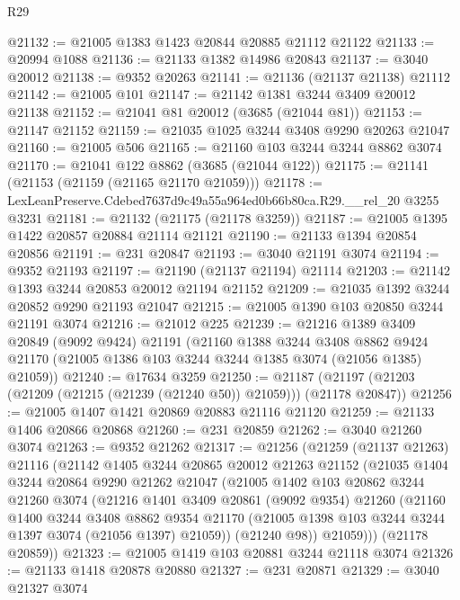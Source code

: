 \begin{lexlean}{R29}
\begin{coremodule}
@21132 := @21005 @1383 @1423 @20844 @20885 @21112 @21122
@21133 := @20994 @1088
@21136 := @21133 @1382 @14986 @20843
@21137 := @3040 @20012
@21138 := @9352 @20263
@21141 := @21136 (@21137 @21138) @21112
@21142 := @21005 @101
@21147 := @21142 @1381 @3244 @3409 @20012 @21138
@21152 := @21041 @81 @20012 (@3685 (@21044 @81))
@21153 := @21147 @21152
@21159 := @21035 @1025 @3244 @3408 @9290 @20263 @21047
@21160 := @21005 @506
@21165 := @21160 @103 @3244 @3244 @8862 @3074
@21170 := @21041 @122 @8862 (@3685 (@21044 @122))
@21175 := @21141 (@21153 (@21159 (@21165 @21170 @21059)))
@21178 := LexLeanPreserve.Cdebed7637d9c49a55a964ed0b66b80ca.R29.__rel_20 @3255 @3231
@21181 := @21132 (@21175 (@21178 @3259))
@21187 := @21005 @1395 @1422 @20857 @20884 @21114 @21121
@21190 := @21133 @1394 @20854 @20856
@21191 := @231 @20847
@21193 := @3040 @21191 @3074
@21194 := @9352 @21193
@21197 := @21190 (@21137 @21194) @21114
@21203 := @21142 @1393 @3244 @20853 @20012 @21194 @21152
@21209 := @21035 @1392 @3244 @20852 @9290 @21193 @21047
@21215 := @21005 @1390 @103 @20850 @3244 @21191 @3074
@21216 := @21012 @225
@21239 := @21216
    @1389
    @3409
    @20849
    (@9092 @9424)
    @21191
    (@21160
      @1388
      @3244
      @3408
      @8862
      @9424
      @21170
      (@21005 @1386 @103 @3244 @3244 @1385 @3074 (@21056 @1385) @21059))
@21240 := @17634 @3259
@21250 := @21187 (@21197 (@21203 (@21209 (@21215 (@21239 (@21240 @50)) @21059))) (@21178 @20847))
@21256 := @21005 @1407 @1421 @20869 @20883 @21116 @21120
@21259 := @21133 @1406 @20866 @20868
@21260 := @231 @20859
@21262 := @3040 @21260 @3074
@21263 := @9352 @21262
@21317 := @21256
    (@21259
      (@21137 @21263)
      @21116
      (@21142
        @1405
        @3244
        @20865
        @20012
        @21263
        @21152
        (@21035
          @1404
          @3244
          @20864
          @9290
          @21262
          @21047
          (@21005
            @1402
            @103
            @20862
            @3244
            @21260
            @3074
            (@21216
              @1401
              @3409
              @20861
              (@9092 @9354)
              @21260
              (@21160
                @1400
                @3244
                @3408
                @8862
                @9354
                @21170
                (@21005 @1398 @103 @3244 @3244 @1397 @3074 (@21056 @1397) @21059))
              (@21240 @98))
            @21059)))
      (@21178 @20859))
@21323 := @21005 @1419 @103 @20881 @3244 @21118 @3074
@21326 := @21133 @1418 @20878 @20880
@21327 := @231 @20871
@21329 := @3040 @21327 @3074

\end{coremodule}
\end{lexlean}
